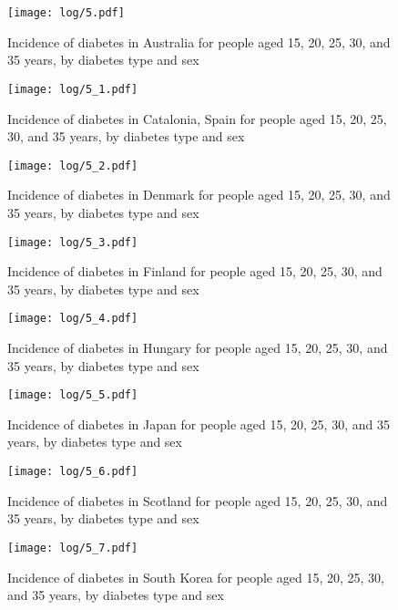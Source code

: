 \documentclass[11pt]{article}
\begin{document}
\color{Blue4}
\begin{stlog}\end{stlog}
\begin{figure}
    \centering
    \texttt{[image: log/5.pdf]}
    \caption{Incidence of diabetes in Australia for people aged 15, 20, 25, 30, and 35 years, by diabetes type and sex}
    \label{Australia agespec}
\end{figure}
\begin{figure}
    \centering
    \texttt{[image: log/5\_1.pdf]}
    \caption{Incidence of diabetes in Catalonia, Spain for people aged 15, 20, 25, 30, and 35 years, by diabetes type and sex}
    \label{Catalonia, Spain agespec}
\end{figure}
\begin{figure}
    \centering
    \texttt{[image: log/5\_2.pdf]}
    \caption{Incidence of diabetes in Denmark for people aged 15, 20, 25, 30, and 35 years, by diabetes type and sex}
    \label{Denmark agespec}
\end{figure}
\begin{figure}
    \centering
    \texttt{[image: log/5\_3.pdf]}
    \caption{Incidence of diabetes in Finland for people aged 15, 20, 25, 30, and 35 years, by diabetes type and sex}
    \label{Finland agespec}
\end{figure}
\begin{figure}
    \centering
    \texttt{[image: log/5\_4.pdf]}
    \caption{Incidence of diabetes in Hungary for people aged 15, 20, 25, 30, and 35 years, by diabetes type and sex}
    \label{Hungary agespec}
\end{figure}
\begin{figure}
    \centering
    \texttt{[image: log/5\_5.pdf]}
    \caption{Incidence of diabetes in Japan for people aged 15, 20, 25, 30, and 35 years, by diabetes type and sex}
    \label{Japan agespec}
\end{figure}
\begin{figure}
    \centering
    \texttt{[image: log/5\_6.pdf]}
    \caption{Incidence of diabetes in Scotland for people aged 15, 20, 25, 30, and 35 years, by diabetes type and sex}
    \label{Scotland agespec}
\end{figure}
\begin{figure}
    \centering
    \texttt{[image: log/5\_7.pdf]}
    \caption{Incidence of diabetes in South Korea for people aged 15, 20, 25, 30, and 35 years, by diabetes type and sex}
    \label{South Korea agespec}
\end{figure}
\begin{stlog}\end{stlog}
\color{black}
\end{document}

